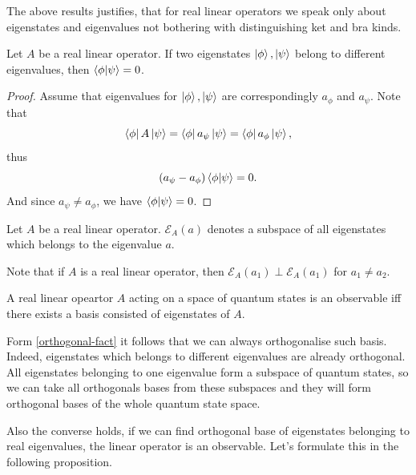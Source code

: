 \documentclass[main.tex]{subfiles}
\begin{document}
The above results justifies, that for real linear operators we speak only about eigenstates and eigenvalues not bothering with distinguishing ket and bra kinds.

\begin{proposition}
\label{orthogonal-fact}
Let $A$ be a real linear operator. If two eigenstates $\ket{\phi}, \ket{\psi}$ belong to different eigenvalues, then $\bra{\phi}\ket{\psi} = 0$.
\end{proposition}
\begin{proof}
Assume that eigenvalues for $\ket{\phi}, \ket{\psi}$ are correspondingly $a_\phi$ and $a_\psi$. Note that
\begin{equation}
\bra{\phi}A\ket{\psi} = \bra{\phi}a_\psi\ket{\psi} = \bra{\phi}a_\phi\ket{\psi},
\end{equation}
thus
\begin{equation}
(a_\psi - a_\phi) \bra{\phi}\ket{\psi} = 0.
\end{equation}
And since $a_\psi \not= a_\phi$, we have $\bra{\phi}\ket{\psi} = 0$.
\end{proof} 

\begin{definition}
Let $A$ be a real linear operator.
$\mathcal{E}_A(a)$ denotes a subspace of all eigenstates which belongs to the eigenvalue $a$.
\end{definition}

Note that if $A$ is a real linear operator, then $\mathcal{E}_A(a_1) \perp \mathcal{E}_A(a_1)$ for $a_1 \not= a_2$.

\begin{definition}
A real linear opeartor $A$ acting on a space of quantum states is an observable iff there exists a basis consisted of eigenstates of $A$.  
\end{definition}

Form \ref{orthogonal-fact} it follows that we can always orthogonalise such basis. Indeed, eigenstates which belongs to different eigenvalues are already orthogonal. All eigenstates belonging to one eigenvalue form a subspace of quantum states, so we can take all orthogonals bases from these subspaces and they will form orthogonal bases of the whole quantum state space.

Also the converse holds, if we can find orthogonal base of eigenstates belonging to real eigenvalues, the linear operator is an observable. Let's formulate this in the following proposition.
\end{document}
